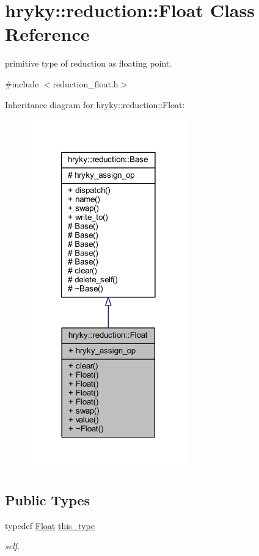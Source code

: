 \hypertarget{classhryky_1_1reduction_1_1_float}{\section{hryky\-:\-:reduction\-:\-:Float Class Reference}
\label{classhryky_1_1reduction_1_1_float}
}


primitive type of reduction as floating point.  




{\ttfamily \#include $<$reduction\-\_\-float.\-h$>$}



Inheritance diagram for hryky\-:\-:reduction\-:\-:Float\-:
\nopagebreak
\begin{figure}[H]
\begin{center}
\leavevmode
\includegraphics[width=194pt]{classhryky_1_1reduction_1_1_float__inherit__graph}
\end{center}
\end{figure}
\subsection*{Public Types}
\begin{DoxyCompactItemize}
\item 
\hypertarget{classhryky_1_1reduction_1_1_float_aad5606baf01147eb8811fe3d0dfd297a}{typedef \hyperlink{classhryky_1_1reduction_1_1_float}{Float} \hyperlink{classhryky_1_1reduction_1_1_float_aad5606baf01147eb8811fe3d0dfd297a}{this\-\_\-type}}\label{classhryky_1_1reduction_1_1_float_aad5606baf01147eb8811fe3d0dfd297a}

\begin{DoxyCompactList}\small\item\em self. \end{DoxyCompactList}\end{DoxyCompactItemize}
